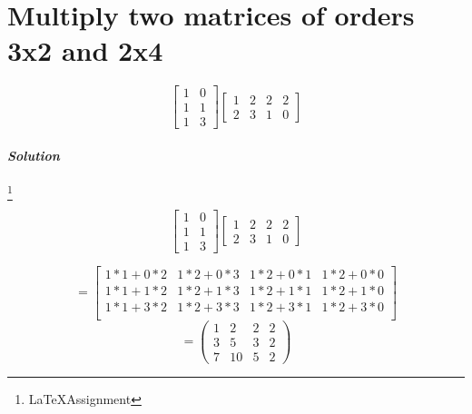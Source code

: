 \documentclass{report}
\newcommand\blfootnote[1]{%
  \begingroup
  \renewcommand\thefootnote{}\footnote{#1}%
  \addtocounter{footnote}{-1}%
  \endgroup
}
\begin{document}
	\section{\large{Multiply two matrices of orders 3x2 and 2x4}}
	
		\[
		\left[
		\begin{matrix}
			1&0\\
			1&1\\
			1&3
		\end{matrix}
		\right]
		\left[
		\begin{matrix}
			1&2&2&2\\
			2&3&1&0
		\end{matrix}
		\right]
		\]
		\newline
		\paragraph{\textit{Solution}}
			\blfootnote{\LaTeX Assignment}{}
			\[
			\left[
			\begin{matrix}
				1&0\\
				1&1\\
				1&3
			\end{matrix}
			\right]
			\left[
			\begin{matrix}
				1&2&2&2\\
				2&3&1&0
			\end{matrix}
			\right]
			\]
			
			\[ = 
			\left[
			\begin{matrix}
				1*1+0*2 & 1*2+0*3 & 1*2+0*1 & 1*2+0*0\\
				1*1+1*2 & 1*2+1*3 & 1*2+1*1 & 1*2+1*0\\
				1*1+3*2 & 1*2+3*3 & 1*2+3*1 & 1*2+3*0\\
				
			\end{matrix}
			\right]
			\]
			\begin{equation*}
				= \begin{pmatrix}
					1 & 2 & 2 & 2\\
					3 & 5 & 3 & 2\\
					7 & 10 & 5 & 2
				
				\end{pmatrix}
			\end{equation*}
	
	
	
\end{document}
